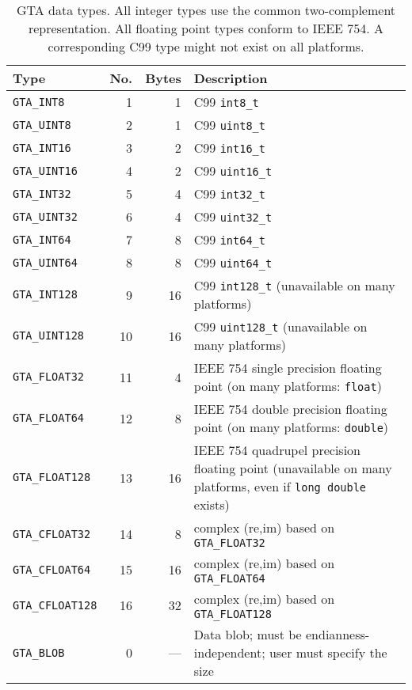 \documentclass[a4paper,11pt]{article}
\newcommand{\code}[1]{\texttt{#1}}
\begin{document}
\begin{table}
\begin{tabular}{l|r|r|p{}}
Type & No. & Bytes & Description\\\hline
\code{GTA\_INT8}      &  1 & 1		& C99 \code{int8\_t}		\\
\code{GTA\_UINT8}     &  2 & 1 		& C99 \code{uint8\_t}		\\
\code{GTA\_INT16}     &  3 & 2 		& C99 \code{int16\_t}		\\
\code{GTA\_UINT16}    &  4 & 2 		& C99 \code{uint16\_t} 	\\
\code{GTA\_INT32}     &  5 & 4 		& C99 \code{int32\_t}		\\
\code{GTA\_UINT32}    &  6 & 4 		& C99 \code{uint32\_t}		\\
\code{GTA\_INT64}     &  7 & 8 		& C99 \code{int64\_t} 		\\
\code{GTA\_UINT64}    &  8 & 8 		& C99 \code{uint64\_t}		\\
\code{GTA\_INT128}    &  9 & 16		& C99 \code{int128\_t} (unavailable on many platforms)		\\
\code{GTA\_UINT128}   & 10 & 16		& C99 \code{uint128\_t} (unavailable on many platforms)		\\
\code{GTA\_FLOAT32}   & 11 & 4 		& IEEE 754 single precision floating point (on many platforms: \code{float}) \\
\code{GTA\_FLOAT64}   & 12 & 8 		& IEEE 754 double precision floating point (on many platforms: \code{double}) \\
\code{GTA\_FLOAT128}  & 13 & 16		& IEEE 754 quadrupel precision floating point (unavailable on many platforms, even if \code{long double} exists) \\
\code{GTA\_CFLOAT32}  & 14 & 8		& complex (re,im) based on \code{GTA\_FLOAT32} \\
\code{GTA\_CFLOAT64}  & 15 & 16		& complex (re,im) based on \code{GTA\_FLOAT64} \\
\code{GTA\_CFLOAT128} & 16 & 32		& complex (re,im) based on \code{GTA\_FLOAT128} \\
\code{GTA\_BLOB}      &  0 & ---    	& Data blob; must be endianness-independent; user must specify the size \\
\end{tabular}
\caption{GTA data types. All integer types use the common two-complement
representation. All floating point types conform to IEEE 754. A corresponding
C99 type might not exist on all platforms.}
\label{tab:types}
\end{table}
\end{document}

